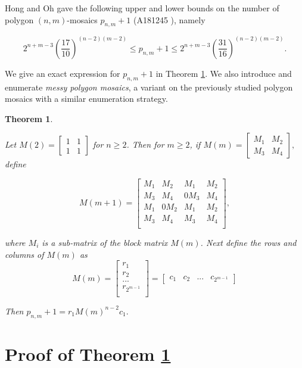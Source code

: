 \documentclass[12pt]{article}
\theoremstyle{plain}
\newtheorem{thm}{Theorem}
\theoremstyle{definition}
\theoremstyle{remark}
\theoremstyle{definition}
\begin{document}
Hong and Oh \cite[Hong2018]{Hong2018} gave the following upper and lower bounds on the number of polygon $(n,m)$-mosaics $p_{n,m}+1$ (A181245 \cite[OEIS]{oeis}), namely

$$2^{n+m-3} \left(\frac{17}{10}\right)^{(n-2)(m-2)} \leq p_{n,m} + 1 \leq 2^{n+m-3} \left(\frac{31}{16}\right)^{(n-2)(m-2)}.$$

We give an exact expression for $p_{n,m} + 1$ in Theorem \ref{thm: main theorem}. We also introduce and enumerate \textit{messy polygon mosaics}, a variant on the previously studied polygon mosaics with a similar enumeration strategy.

\begin{thm}
\label{thm: main theorem}

Let $
M(2) = \begin{bmatrix}
1 & 1 \\
1 & 1
\end{bmatrix}
$ for $n \geq 2$. Then for $m \geq 2$, if 
$
M(m) = \begin{bmatrix}
M_1 & M_2 \\
M_3 & M_4
\end{bmatrix},
$ define

$$
M(m+1) = \begin{bmatrix}
M_1 & M_2 & M_1 & M_2 \\
M_3 & M_4 & 0M_3 & M_4 \\
M_1 & 0M_2 & M_1 & M_2 \\
M_3 & M_4 & M_3 & M_4 \\
\end{bmatrix},
$$

where $M_i$ is a sub-matrix of the block matrix $M(m)$. Next define the rows and columns of $M(m)$ as
$$
M(m) = 
\begin{bmatrix}
    r_1 \\
    r_2 \\
    ... \\
    r_{2^{m-1}} \\
\end{bmatrix} = 
\begin{bmatrix}
    c_1 & c_2 & ... & c_{2^{m-1}}
\end{bmatrix}
$$

Then $p_{n,m}+1 = r_1 M(m)^{n-2}c_1 .$
\end{thm}

\section{Proof of Theorem \ref{thm: main theorem}}
\end{document}
